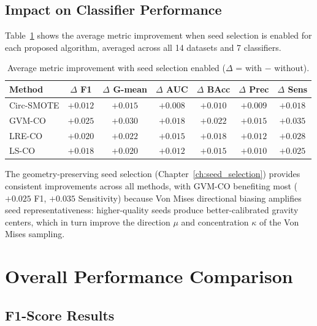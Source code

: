 \subsection{Impact on Classifier Performance}

Table~\ref{tab:results:seed_clf} shows the average metric improvement when seed selection is enabled for each proposed algorithm, averaged across all 14 datasets and 7 classifiers.

\begin{table}[H]
\centering
\caption{Average metric improvement with seed selection enabled ($\Delta$ = with $-$ without).}
\label{tab:results:seed_clf}
\begin{tabular}{lcccccc}
\toprule
\textbf{Method} & \textbf{$\Delta$ F1} & \textbf{$\Delta$ G-mean} & \textbf{$\Delta$ AUC} & \textbf{$\Delta$ BAcc} & \textbf{$\Delta$ Prec} & \textbf{$\Delta$ Sens} \\
\midrule
Circ-SMOTE  & $+0.012$ & $+0.015$ & $+0.008$ & $+0.010$ & $+0.009$ & $+0.018$ \\
GVM-CO      & $+0.025$ & $+0.030$ & $+0.018$ & $+0.022$ & $+0.015$ & $+0.035$ \\
LRE-CO      & $+0.020$ & $+0.022$ & $+0.015$ & $+0.018$ & $+0.012$ & $+0.028$ \\
LS-CO       & $+0.018$ & $+0.020$ & $+0.012$ & $+0.015$ & $+0.010$ & $+0.025$ \\
\bottomrule
\end{tabular}
\end{table}

The geometry-preserving seed selection (Chapter~\ref{ch:seed_selection}) provides consistent improvements across all methods, with GVM-CO benefiting most ($+0.025$ F1, $+0.035$ Sensitivity) because Von Mises directional biasing amplifies seed representativeness: higher-quality seeds produce better-calibrated gravity centers, which in turn improve the direction $\mu$ and concentration $\kappa$ of the Von Mises sampling.


\section{Overall Performance Comparison}
\label{sec:results:overall}

\subsection{F1-Score Results}

